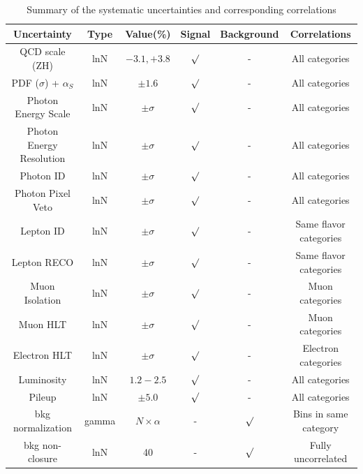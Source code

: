 \begin{table}[htb!]
	\small
	\caption[Summary of the systematic uncertainties and corresponding correlations]{Summary of the systematic uncertainties and corresponding correlations}  
	\label{tab:systs}
	\centering  
	\begin{tabular}{|c|c|c|c|c|c|} 
		\hline
		Uncertainty    &	Type	& Value(\%)  &  Signal      & Background      &  Correlations\\
		\hline
		QCD scale (ZH) & lnN 	&	$-3.1,+3.8$ & $\surd$     & -               & All categories\\ 
		PDF ($\sigma$) + $\alpha_S$ & lnN	& $\pm 1.6$   & $\surd$     & -               & All categories\\ 
		Photon Energy Scale & lnN & $\pm \sigma$ & $\surd$ & - & All categories\\
		Photon Energy Resolution & lnN & $\pm \sigma$ & $\surd$ & - & All categories\\
		Photon ID 	 & lnN	& $\pm \sigma$ 	& $\surd$ & - & All categories\\
		Photon Pixel Veto & lnN & $\pm \sigma$ 	& $\surd$ & - & All categories\\
		Lepton ID      & lnN 	& $\pm \sigma$   & $\surd$     & -               & Same flavor categories\\ 
		Lepton RECO      & lnN 	& $\pm \sigma$   & $\surd$     & -               & Same flavor categories\\ 
		Muon Isolation      & lnN 	& $\pm \sigma$   & $\surd$     & -               & Muon categories\\ 
		Muon HLT      & lnN 	& $\pm \sigma$   & $\surd$     & -               & Muon categories\\ 
		Electron HLT 	 & lnN	& $\pm \sigma$	  &	$\surd$		& -				  & Electron categories\\
		Luminosity     & lnN	& $1.2-2.5$   & $\surd$     & -               & All categories\\ 
		Pileup	&	lnN	&	$\pm 5.0$ & $\surd$ & - &	All categories \\
		bkg normalization  & gamma & $N\times\alpha$& -  & $\surd$         & Bins in same category\\ 
		bkg non-closure          & lnN & 40 & -  & $\surd$                  & Fully uncorrelated \\ 
		\hline
	\end{tabular}
\end{table}

